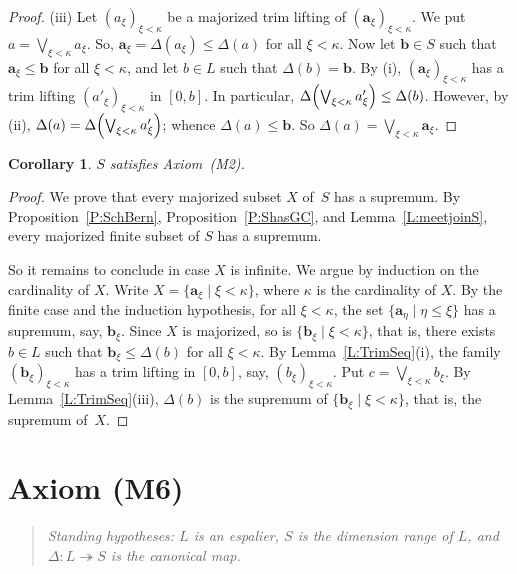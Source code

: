 \documentclass[psamsfonts,reqno]{memo-l}
\theoremstyle{plain}
\newtheorem{corollary}[lemma]{Corollary}
\theoremstyle{definition}
\theoremstyle{remark}
\numberwithin{equation}{section}
\newcommand{\la}{\boldsymbol{a}}
\newcommand{\lb}{\boldsymbol{b}}
\newcommand{\DD}{\Delta}
\newcommand{\set}[1]{\{#1\}}
\newcommand{\setm}[2]{\set{#1\mid#2}}
\newcommand{\famm}[2]{(#1)_{#2}}
\begin{document}
\begin{proof}
(iii) Let $\famm{a_\xi}{\xi<\kappa}$ be a majorized trim lifting of
$\famm{\la_\xi}{\xi<\kappa}$. We put $a=\bigvee_{\xi<\kappa}a_\xi$.
So, $\la_\xi=\DD(a_\xi)\leq\DD(a)$ for all $\xi<\kappa$. Now let $\lb\in S$
such that $\la_\xi\leq\lb$ for all $\xi<\kappa$, and let $b\in L$ such that
$\DD(b)=\lb$. By (i), $\famm{\la_\xi}{\xi<\kappa}$ has a trim lifting
$\famm{a'_\xi}{\xi<\kappa}$ in $[0,b]$. In particular,
$\DD\Bigl(\bigvee_{\xi<\kappa}a'_\xi\Bigr)\leq\DD(b)$. However, by (ii),
$\DD(a)=\DD\Bigl(\bigvee_{\xi<\kappa}a'_\xi\Bigr)$; whence $\DD(a)\leq\lb$.
So $\DD(a)=\bigvee_{\xi<\kappa}\la_\xi$.
\end{proof}

\begin{corollary}\label{C:ShasM1}
$S$ satisfies Axiom~\textup{(M2)}.
\end{corollary}

\begin{proof}
We prove that every majorized subset $X$ of~$S$ has a supremum.
By Proposition~\ref{P:SchBern}, Proposition~\ref{P:ShasGC}, and
Lemma~\ref{L:meetjoinS}, every majorized finite subset of
$S$ has a supremum.

So it remains to conclude in case $X$ is infinite. We argue by induction on
the cardinality of $X$. Write $X=\setm{\la_\xi}{\xi<\kappa}$, where $\kappa$
is the cardinality of $X$. By the finite case and the induction hypothesis,
for all $\xi<\kappa$, the set $\setm{\la_\eta}{\eta\leq\xi}$ has a supremum,
say, $\lb_\xi$. Since $X$ is majorized, so is $\setm{\lb_\xi}{\xi<\kappa}$,
that is, there exists $b\in L$ such that $\lb_\xi\leq\DD(b)$ for all
$\xi<\kappa$. By Lemma~\ref{L:TrimSeq}(i), the family
$\famm{\lb_\xi}{\xi<\kappa}$ has a trim lifting in $[0,b]$, say,
$\famm{b_\xi}{\xi<\kappa}$. Put $c=\bigvee_{\xi<\kappa}b_\xi$.
By Lemma~\ref{L:TrimSeq}(iii), $\DD(b)$ is the supremum of
$\setm{\lb_\xi}{\xi<\kappa}$, that is, the supremum of~$X$.
\end{proof}

\section{Axiom (M6)}\label{S:Shas(M6)}

\begin{quote}
\em Standing hypotheses: $L$ is an espalier, $S$ is the
dimension range of $L$, and $\DD\colon
L\twoheadrightarrow S$ is the canonical map.
\end{quote}
\end{document}
